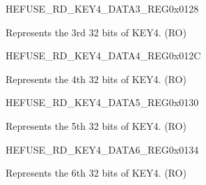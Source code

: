 \begin{register}{H}{EFUSE\_RD\_KEY4\_DATA3\_REG}{0x0128}\label{regdesc:EFUSERDKEY4DATA3REG}
%
\regnewline%
\begin{regdesc}\begin{reglist}
\label{fielddesc:EFUSEKEY4DATA3}\item [EFUSE\_KEY4\_DATA3] Represents the 3rd 32 bits of KEY4. (RO)
\end{reglist}\end{regdesc}
\end{register}


\begin{register}{H}{EFUSE\_RD\_KEY4\_DATA4\_REG}{0x012C}\label{regdesc:EFUSERDKEY4DATA4REG}
%
\regnewline%
\begin{regdesc}\begin{reglist}
\label{fielddesc:EFUSEKEY4DATA4}\item [EFUSE\_KEY4\_DATA4] Represents the 4th 32 bits of KEY4. (RO)
\end{reglist}\end{regdesc}
\end{register}


\begin{register}{H}{EFUSE\_RD\_KEY4\_DATA5\_REG}{0x0130}\label{regdesc:EFUSERDKEY4DATA5REG}
%
\regnewline%
\begin{regdesc}\begin{reglist}
\label{fielddesc:EFUSEKEY4DATA5}\item [EFUSE\_KEY4\_DATA5] Represents the 5th 32 bits of KEY4. (RO)
\end{reglist}\end{regdesc}
\end{register}


\begin{register}{H}{EFUSE\_RD\_KEY4\_DATA6\_REG}{0x0134}\label{regdesc:EFUSERDKEY4DATA6REG}
%
\regnewline%
\begin{regdesc}\begin{reglist}
\label{fielddesc:EFUSEKEY4DATA6}\item [EFUSE\_KEY4\_DATA6] Represents the 6th 32 bits of KEY4. (RO)
\end{reglist}\end{regdesc}
\end{register}


